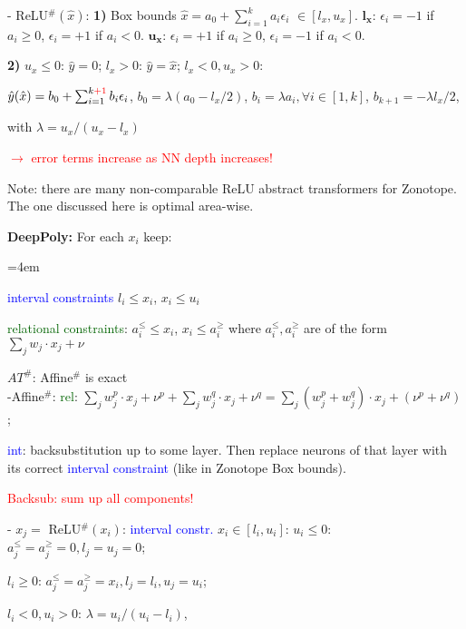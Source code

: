 \documentclass[11pt,landscape,a4paper,fleqn]{article}
\begin{document}
\begin{multicols*}{4}
- ReLU$^\#(\hat{x})$: \textbf{1)} Box bounds $\hat{x}$$ = a_0 + \sum_{i=1}^{k} a_i\epsilon_i$ $\in [l_x,u_x]$. $\mathbf{l_x}$: $\epsilon_i = -1$ if $a_i \geq 0$, $\epsilon_i = +1$ if $a_i < 0$. $\mathbf{u_x}$: $\epsilon_i = +1$ if $a_i \geq 0$, $\epsilon_i = -1$ if $a_i < 0$.

\textbf{2)} $u_x \leq 0$: $\hat{y} = 0$; $l_x > 0$: $\hat{y} = \hat{x}$; $l_x < 0, u_x > 0$:

$\hat{y}(\hat{x}) = b_0 + \sum_{i=1}^{k\textcolor{red}{+1}} b_i \epsilon_i$, $b_0 = \lambda(a_0 - l_x/2)$, $b_i = \lambda a_i, \forall i \in [1,k]$, $b_{k+1} = -\lambda l_x / 2$,

with $\lambda = u_x / (u_x - l_x)$

\textcolor{red}{$\rightarrow$ error terms increase as NN depth increases!}

Note: there are many non-comparable ReLU abstract transformers for Zonotope. The one discussed here is optimal area-wise.
\vspace*{1mm}

\textbf{DeepPoly:} For each $x_i$ keep:

\begin{compactitem}=4em
	\item \textcolor{blue}{interval constraints} $l_i \leq x_i$, $x_i \leq u_i$
	\item \textcolor{darkgreen}{relational constraints}: $a_i^\leq \leq x_i$, $x_i \leq a_i^\geq$ where $a_i^\leq, a_i^\geq$ are of the form $\sum_j w_j \cdot x_j + \nu$
\end{compactitem}
\vspace*{1mm}

$AT^\#$: Affine$^\#$ is exact\\
-Affine$^\#$: \textcolor{darkgreen}{rel}: $\sum_j w_j^p \cdot x_j + \nu^p + \sum_j w_j^q \cdot x_j + \nu^q = \sum_j (w_j^p + w_j^q) \cdot x_j + (\nu^p + \nu^q)$;

\textcolor{blue}{int}: backsubstitution up to some layer. Then replace neurons of that layer with its correct \textcolor{blue}{interval constraint} (like in Zonotope Box bounds).

\textcolor{red}{Backsub: sum up all components!}

- $x_j =$ ReLU$^\#(x_i)$: \textcolor{blue}{interval constr.} $x_i \in [l_i, u_i]$:
{$u_i \leq 0$:} $a_j^\leq = a_j^\geq = 0, l_j = u_j = 0$;

{$l_i \geq 0$:} $a_j^\leq = a_j^\geq = x_i, l_j = l_i, u_j = u_i$;

{$l_i < 0, u_i > 0$:} $\lambda = u_i / (u_i - l_i)$,


\end{multicols*}
\end{document}
